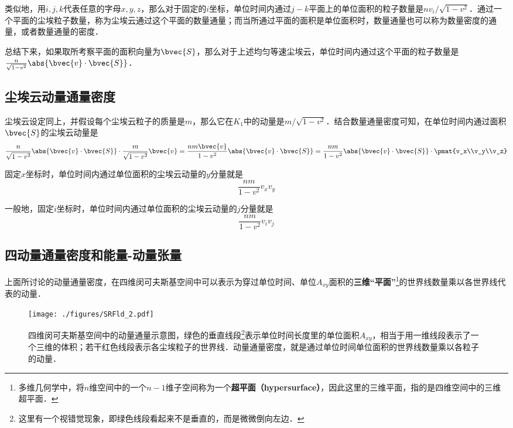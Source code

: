 类似地，用$i, j, k$代表任意的字母$x, y, z$，那么对于固定的$i$坐标，单位时间内通过$j-k$平面上的单位面积的粒子数量是$nv_i/\sqrt{1-v^2}$．通过一个平面的尘埃粒子数量，称为尘埃云通过这个平面的数量通量；而当所通过平面的面积是单位面积时，数量通量也可以称为数量密度的通量，或者数量通量的密度．

总结下来，如果取所考察平面的面积向量为$\bvec{S}$，那么对于上述均匀等速尘埃云，单位时间内通过这个平面的粒子数量是$\frac{n}{\sqrt{1-v^2}}\abs{\bvec{v}\cdot\bvec{S}}$．

\subsection{尘埃云动量通量密度}

尘埃云设定同上，并假设每个尘埃云粒子的质量是$m$，那么它在$K_1$中的动量是$m/\sqrt{1-v^2}$．结合数量通量密度可知，在单位时间内通过面积$\bvec{S}$的尘埃云动量是
\begin{equation}
\frac{n}{\sqrt{1-v^2}}\abs{\bvec{v}\cdot\bvec{S}}\cdot\frac{m}{\sqrt{1-v^2}}\bvec{v}=\frac{nm\bvec{v}}{1-v^2}\abs{\bvec{v}\cdot\bvec{S}}=\frac{nm}{1-v^2}\abs{\bvec{v}\cdot\bvec{S}}\cdot\pmat{v_x\\v_y\\v_z}
\end{equation}

固定$x$坐标时，单位时间内通过单位面积的尘埃云动量的$y$分量就是
\begin{equation}
\frac{nm}{1-v^2}v_xv_y
\end{equation}

一般地，固定$i$坐标时，单位时间内通过单位面积的尘埃云动量的$j$分量就是
\begin{equation}\label{SRFld_eq1}
\frac{nm}{1-v^2}v_iv_j
\end{equation}

\subsection{四动量通量密度和能量-动量张量}

上面所讨论的动量通量密度，在四维闵可夫斯基空间中可以表示为穿过单位时间、单位$A_{xy}$面积的\textbf{三维“平面”}\footnote{多维几何学中，将$n$维空间中的一个$n-1$维子空间称为一个\textbf{超平面（hypersurface）}，因此这里的三维平面，指的是四维空间中的三维超平面．}的世界线数量乘以各世界线代表的动量．

\begin{figure}[ht]
\centering
\texttt{[image: ./figures/SRFld\_2.pdf]}
\caption{四维闵可夫斯基空间中的动量通量示意图，绿色的垂直线段\footnote{这里有一个视错觉现象，即绿色线段看起来不是垂直的，而是微微倒向左边．}表示单位时间长度里的单位面积$A_{xy}$，相当于用一维线段表示了一个三维的体积；若干红色线段表示各尘埃粒子的世界线．动量通量密度，就是通过单位时间单位面积的世界线数量乘以各粒子的动量．} \label{SRFld_fig2}
\end{figure}

